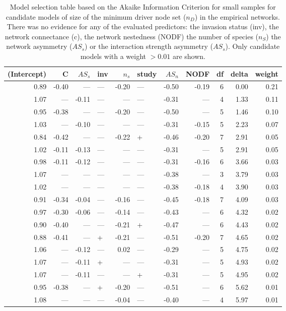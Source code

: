 \documentclass[a4paper]{artikel1}
\theoremstyle{definition}
\theoremstyle{definition}
\theoremstyle{definition}
\theoremstyle{remark}
\begin{document}
\begin{table}

\caption{\label{tab:tab-controllability-model-results}Model selection table based on the Akaike Information Criterion for small samples for candidate models of size of the minimum driver node set ($n_D$) in the empirical networks. There was no evidence for any of the evaluated predictors: the invasion status (inv), the network connectance (c), the network nestedness (NODF) the number of species ($n_S$) the network asymmetry ($AS_s$) or the interaction strength asymmetry ($AS_s$). Only candidate models with a weight $>0.01$ are shown.}
\centering
\fontsize{8}{10}\selectfont
\begin{tabular}[t]{rrrlrlrrrrr}
\toprule
(Intercept) & C & $AS_s$ & inv & $n_s$ & study & $AS_n$ & NODF & df & delta & weight\\
\midrule
0.89 & -0.40 & --- & --- & -0.20 & --- & -0.50 & -0.19 & 6 & 0.00 & 0.21\\
1.07 & --- & -0.11 & --- & --- & --- & -0.31 & --- & 4 & 1.33 & 0.11\\
0.95 & -0.38 & --- & --- & -0.20 & --- & -0.50 & --- & 5 & 1.46 & 0.10\\
1.03 & --- & -0.10 & --- & --- & --- & -0.31 & -0.15 & 5 & 2.23 & 0.07\\
0.84 & -0.42 & --- & --- & -0.22 & + & -0.46 & -0.20 & 7 & 2.91 & 0.05\\
1.02 & -0.11 & -0.13 & --- & --- & --- & -0.31 & --- & 5 & 2.91 & 0.05\\
0.98 & -0.11 & -0.12 & --- & --- & --- & -0.31 & -0.16 & 6 & 3.66 & 0.03\\
1.07 & --- & --- & --- & --- & --- & -0.38 & --- & 3 & 3.79 & 0.03\\
1.02 & --- & --- & --- & --- & --- & -0.38 & -0.18 & 4 & 3.90 & 0.03\\
0.91 & -0.34 & -0.04 & --- & -0.16 & --- & -0.45 & -0.18 & 7 & 4.09 & 0.03\\
0.97 & -0.30 & -0.06 & --- & -0.14 & --- & -0.43 & --- & 6 & 4.32 & 0.02\\
0.90 & -0.40 & --- & --- & -0.21 & + & -0.47 & --- & 6 & 4.43 & 0.02\\
0.88 & -0.41 & --- & + & -0.21 & --- & -0.51 & -0.20 & 7 & 4.65 & 0.02\\
1.06 & --- & -0.12 & --- & 0.02 & --- & -0.29 & --- & 5 & 4.75 & 0.02\\
1.07 & --- & -0.11 & + & --- & --- & -0.31 & --- & 5 & 4.93 & 0.02\\
1.07 & --- & -0.11 & --- & --- & + & -0.31 & --- & 5 & 4.95 & 0.02\\
0.95 & -0.38 & --- & + & -0.20 & --- & -0.51 & --- & 6 & 5.62 & 0.01\\
1.08 & --- & --- & --- & -0.04 & --- & -0.40 & --- & 4 & 5.97 & 0.01\\
\bottomrule
\end{tabular}
\end{table}
\end{document}
